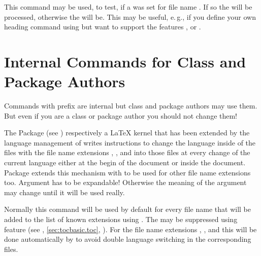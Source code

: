 \begin{Declaration}
\end{Declaration}
%
This command may be used, to test, if a  was set for file name
. If so the  will be processed,
otherwise the  will be. This may be useful, e.\,g.,
if you define your own heading command using  but want to
support the features ,  or .%
%

\section{Internal Commands for Class and Package Authors}
\label{sec:tocbasic.internals}

Commands with prefix  are internal but class and package
authors may use them. But even if you are a class or package author you
should not change them!

\begin{Declaration}
\end{Declaration}
%
The Package  (see \cite{package:babel})
respectively a \LaTeX{} kernel that has been extended by the language
management of  writes instructions to change the language
inside of the files with the file name extensions , , and
 into those files at every change of the current language either at
the begin of the document or inside the document. Package 
extends this mechanism with  to be used for other
file name extensions too. Argument  has to be expandable!
Otherwise the meaning of the argument may change until it will be used really.

Normally this command will be used by default for every file name
 that will be added to the list of known extensions using
. The may be suppressed using feature
 (see ,
\autoref{sec:tocbasic.toc}, ). For the
file name extensions , , and  this will be done
automatically by  to avoid double language switching in the
corresponding files.

